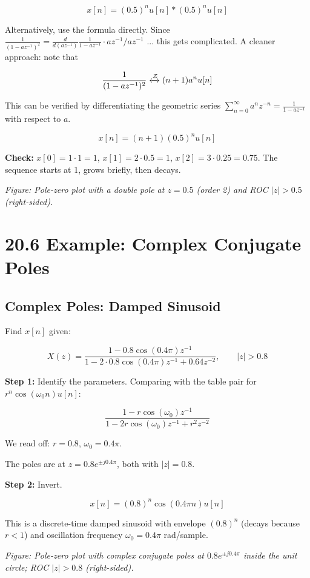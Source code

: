\documentclass[11pt]{article}
\begin{document}
\[x[n] = (0.5)^n u[n] * (0.5)^n u[n]\]

Alternatively, use the formula directly. Since $\frac{1}{(1 - a z^{-1})^2} = \frac{d}{d(a z^{-1})} \frac{1}{1 - a z^{-1}} \cdot a z^{-1} / a z^{-1}$ ... this gets complicated. A cleaner approach: note that

\[\frac{1}{(1 - a z^{-1})^2} \xleftrightarrow{\mathcal{Z}} (n + 1) a^n u[n]\]

This can be verified by differentiating the geometric series $\sum_{n=0}^{\infty} a^n z^{-n} = \frac{1}{1 - a z^{-1}}$ with respect to $a$.

\[x[n] = (n + 1)(0.5)^n u[n]\]

\textbf{Check:} $x[0] = 1 \cdot 1 = 1$, $x[1] = 2 \cdot 0.5 = 1$, $x[2] = 3 \cdot 0.25 = 0.75$. The sequence starts at 1, grows briefly, then decays. \checkmark

\textit{Figure: Pole-zero plot with a double pole at $z = 0.5$ (order 2) and ROC $|z| > 0.5$ (right-sided).}

\section*{20.6 Example: Complex Conjugate Poles}

\subsection*{Complex Poles: Damped Sinusoid}

Find $x[n]$ given:

\[X(z) = \frac{1 - 0.8 \cos(0.4\pi) z^{-1}}{1 - 2 \cdot 0.8 \cos(0.4\pi) z^{-1} + 0.64 z^{-2}}, \qquad |z| > 0.8\]

\textbf{Step 1:} Identify the parameters. Comparing with the table pair for $r^n \cos(\omega_0 n) u[n]$:

\[\frac{1 - r \cos(\omega_0) z^{-1}}{1 - 2 r \cos(\omega_0) z^{-1} + r^2 z^{-2}}\]

We read off: $r = 0.8$, $\omega_0 = 0.4\pi$.

The poles are at $z = 0.8 e^{\pm j 0.4\pi}$, both with $|z| = 0.8$.

\textbf{Step 2:} Invert.

\[x[n] = (0.8)^n \cos(0.4\pi n) u[n]\]

This is a discrete-time damped sinusoid with envelope $(0.8)^n$ (decays because $r < 1$) and oscillation frequency $\omega_0 = 0.4\pi$ rad/sample.

\textit{Figure: Pole-zero plot with complex conjugate poles at $0.8 e^{\pm j 0.4\pi}$ inside the unit circle; ROC $|z| > 0.8$ (right-sided).}
\end{document}

